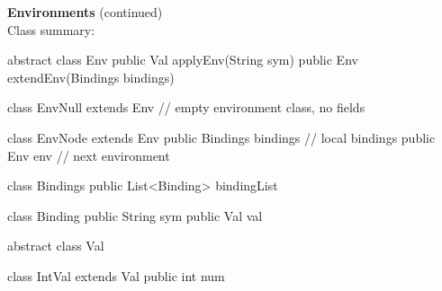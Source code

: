\begin{minipage}[t]{\sw}
\slidenumber
\LARGE
{\bf Environments} (continued)\\[1.5ex]
Class summary:
\Large
\begin{qv}
abstract class Env
    public Val applyEnv(String sym)
    public Env extendEnv(Bindings bindings)

class EnvNull extends Env  // empty environment class, no fields

class EnvNode extends Env
    public Bindings bindings // local bindings
    public Env env     // next environment

class Bindings
    public List<Binding> bindingList

class Binding
    public String sym
    public Val val

abstract class Val

class IntVal extends Val
    public int num
\end{qv}
\end{minipage}
\clearpage
